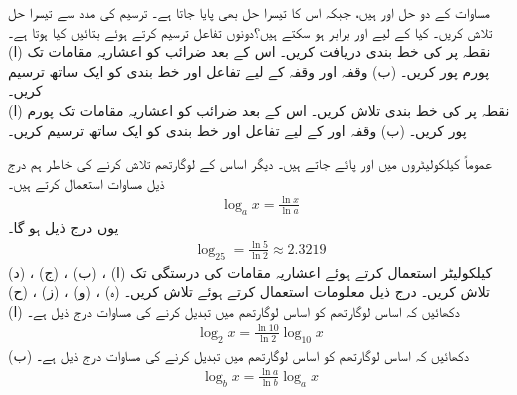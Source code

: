 مساوات  کے دو حل  اور   ہیں، جبکہ اس کا تیسرا حل بھی پایا جاتا ہے۔ ترسیم کی مدد سے تیسرا حل تلاش کریں۔
کیا  کے لیے   اور   برابر ہو سکتے ہیں؟دونوں تفاعل ترسیم کرتے ہوئے بتائیں کیا ہوتا ہے۔
\\
(ا) نقطہ  پر  کی خط بندی دریافت کریں۔ اس کے بعد ضرائب  کو  اعشاریہ مقامات تک   پورم پور کریں۔ (ب) وقفہ  اور وقفہ  کے لیے تفاعل اور خط بندی کو ایک ساتھ ترسیم کریں۔
\\
(ا) نقطہ  پر  کی خط بندی تلاش کریں۔ اس کے بعد ضرائب کو  اعشاریہ  مقامات تک پورم پور کریں۔   (ب) وقفہ  اور  کے لیے تفاعل اور خط بندی کو ایک ساتھ ترسیم کریں۔

عموماً کیلکولیٹروں میں  اور   پائے جاتے ہیں۔ دیگر اساس کے لوگارتھم تلاش کرنے کی خاطر ہم درج ذیل مساوات استعمال کرتے ہیں۔
\begin{align*}
\log_ax=\frac{\ln x}{\ln a}
\end{align*}
یوں درج ذیل ہو گا۔
\begin{align*}
\log_25=\frac{\ln 5}{\ln 2}\approx 2.3219
\end{align*}
کیلکولیٹر استعمال کرتے ہوئے   اعشاریہ مقامات کی درستگی تک 
(ا) ، (ب) ، (ج) ، (د)  تلاش کریں۔ درج ذیل معلومات استعمال کرتے ہوئے  تلاش کریں۔
(ہ) ،  (و) ،  (ز) ،  (ح) 
\\
(ا) دکھائیں کہ اساس  لوگارتھم کو اساس  لوگارتھم میں تبدیل کرنے کی مساوات درج ذیل ہے۔
\begin{align*}
\log_2x=\frac{\ln 10}{\ln 2}\log_{10}x
\end{align*}
(ب) دکھائیں کہ اساس   لوگارتھم کو اساس  لوگارتھم میں تبدیل کرنے  کی مساوات درج ذیل ہے۔
\begin{align*}
\log_bx=\frac{\ln a}{\ln b}\log_ax
\end{align*}

